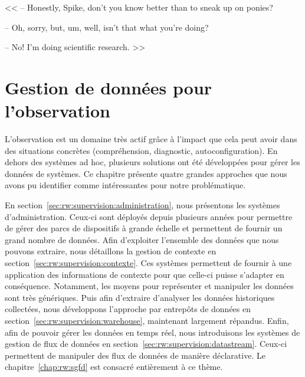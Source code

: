 \begin{savequote}[6cm]
<< -- Honestly, Spike, don't you know better than to sneak up on ponies?

-- Oh, sorry, but, um, well, isn't that what you're doing?

-- No! I'm doing scientific research. >>
\end{savequote}

\chapter{Gestion de données pour l'observation}\label{chap:rw:supervision}
\chaptertoc

L'observation est un domaine très actif grâce à l'impact que cela peut avoir dans des situations concrètes (compréhension, diagnostic, autoconfiguration). En dehors des systèmes ad hoc, plusieurs solutions ont été développées pour gérer les données de systèmes. Ce chapitre présente quatre grandes approches que nous avons pu identifier comme intéressantes pour notre problématique.

En section~\ref{sec:rw:supervision:administration}, nous présentons les systèmes d'administration. Ceux-ci sont déployés depuis plusieurs années pour permettre de gérer des parcs de dispositifs à grande échelle et permettent de fournir un grand nombre de données. Afin d'exploiter l'ensemble des données que nous pouvons extraire, nous détaillons la gestion de contexte en section~\ref{sec:rw:supervision:contexte}. Ces systèmes permettent de fournir à une application des informations de contexte pour que celle-ci puisse s'adapter en conséquence. Notamment, les moyens pour représenter et manipuler les données sont très génériques. Puis afin d'extraire d'analyser les données historiques collectées, nous développons l'approche par entrepôts de données en section~\ref{sec:rw:supervision:warehouse}, maintenant largement répandus. Enfin, afin de pouvoir gérer les données en temps réel, nous introduisons les systèmes de gestion de flux de données en section~\ref{sec:rw:supervision:datastream}. Ceux-ci permettent de manipuler des flux de données de manière déclarative. Le chapitre~\ref{chap:rw:sgfd} est consacré entièrement à ce thème.







